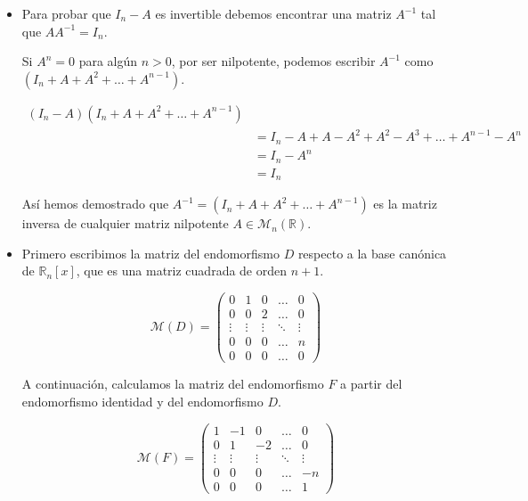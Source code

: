 \begin{itemize}[$\bullet$]
    \item Para probar que $I_n - A$ es invertible debemos encontrar una matriz $A^{-1}$ tal que $AA^{-1} = I_n$.

    Si $A^n = 0$ para algún $n > 0$, por ser nilpotente, podemos escribir $A^{-1}$ como $(I_n + A + A^2 + \ldots + A^{n-1})$.


    \begin{align*}
    (I_n - A)(I_n + A + A^2 + \ldots + A^{n-1})
        \\
        &=I_n - A + A - A^2 + A^2 - A^3 + \ldots + A^{n-1} - A^n\\
        &= I_n - A^n \\
        &= I_n
    \end{align*}

    Así hemos demostrado que $ A^{-1} = (I_n + A + A^2 + \ldots + A^{n-1})$ es la matriz inversa de cualquier matriz nilpotente $A \in \mathcal{M}_n(\mathbb{R})$.

    \vspace{20px}
    \item

    Primero escribimos la matriz del endomorfismo $D$ respecto a la base canónica de $\mathbb{R}_n[x]$, que es una matriz cuadrada de orden $n +1$.

    \begin{equation*}
        \mathcal{M}(D) =
        \begin{pmatrix}
            0      & 1      & 0      & \ldots & 0      \\
            0      & 0      & 2      & \ldots & 0      \\
            \vdots & \vdots & \vdots & \ddots & \vdots \\
            0      & 0      & 0      & \ldots & n      \\
            0      & 0      & 0      & \ldots & 0
        \end{pmatrix}

    \end{equation*}

    A continuación, calculamos la matriz del endomorfismo $F$ a partir del endomorfismo identidad y del endomorfismo $D$.

    \begin{equation*}
        \mathcal{M}(F) =
        \begin{pmatrix}
            1      & -1     & 0      & \ldots & 0      \\
            0      & 1      & -2     & \ldots & 0      \\
            \vdots & \vdots & \vdots & \ddots & \vdots \\
            0      & 0      & 0      & \ldots & -n     \\
            0      & 0      & 0      & \ldots & 1
        \end{pmatrix}
    \end{equation*}


\end{itemize}
